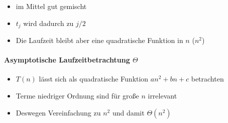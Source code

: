 \documentclass[
    ngerman,
    color=3b,
    dark_mode,
    load_common, %
    summary,
    boxarc,
]{rubos-tuda-template}
\begin{document}
\begin{description}[itemsep=1em]
    \item [\texttt{Average Case}]
          \begin{itemize}
              \item im Mittel gut gemischt
              \item $t_j$ wird dadurch zu $j/2$
              \item Die Laufzeit bleibt aber eine quadratische Funktion in $n$ ($n^2$)
          \end{itemize}
\end{description}

\paragraph{Asymptotische Laufzeitbetrachtung $\Theta$} {\label{insSortLaufzeitTheta}}
\begin{itemize}
    \item $T(n)$ lässt sich als quadratische Funktion $an^2 + bn + c$ betrachten
    \item Terme niedriger Ordnung sind für gro\ss e $n$ irrelevant
    \item Deswegen Vereinfachung zu $n^2$ und damit $\Theta(n^2)$
\end{itemize}
\clearpage
\end{document}
